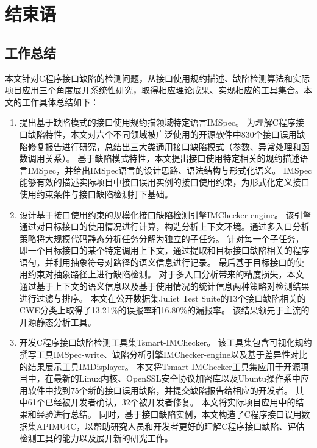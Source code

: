\chapter{结束语}
\label{cha:con}

\section{工作总结}
本文针对C程序接口缺陷的检测问题，从接口使用规约描述、缺陷检测算法和实际项目应用三个角度展开系统性研究，取得相应理论成果、实现相应的工具集合。本文的工作具体总结如下：
\begin{enumerate}
	\item 提出基于缺陷模式的接口使用规约描领域特定语言IMSpec。
	为理解C程序接口缺陷特性，本文对六个不同领域被广泛使用的开源软件中830个接口误用缺陷修复报告进行研究，总结出三大类通用接口缺陷模式（参数、异常处理和函数调用关系）。
	基于缺陷模式特性，本文提出接口使用特定相关的规约描述语言IMSpec，并给出IMSpec语言的设计思路、语法结构与形式化语义。
	IMSpec能够有效的描述实际项目中接口误用实例的接口使用约束，为形式化定义接口使用约束条件与接口缺陷检测打下基础。
	
	\item 设计基于接口使用约束的规模化接口缺陷检测引擎IMChecker-engine。
	该引擎通过对目标接口的使用情况进行计算，构造分析上下文环境。通过多入口分析策略将大规模代码静态分析任务分解为独立的子任务。
	针对每一个子任务，即一个目标接口的某个特定调用上下文，通过提取和目标接口缺陷相关的程序语句，并利用抽象符号对路径的语义信息进行记录。
	最后基于目标接口的使用约束对抽象路径上进行缺陷检测。
	对于多入口分析带来的精度损失，本文通过基于上下文的语义信息以及基于使用情况的统计信息两种策略对检测结果进行过滤与排序。
	本文在公开数据集Juliet Test Suite的13个接口缺陷相关的CWE分类上取得了13.21\%的误报率和16.80\%的漏报率。
	该结果领先于主流的开源静态分析工具。
	
	\item 开发C程序接口缺陷检测工具集Tsmart-IMChecker。
	该工具集包含可视化规约撰写工具IMSpec-write、缺陷分析引擎IMChecker-engine以及基于差异性对比的结果展示工具IMDisplayer。
	本文将Tsmart-IMChecker工具集应用于开源项目中，在最新的Linux内核、OpenSSL安全协议加密库以及Ubuntu操作系中应用软件中找到75个新的接口误用缺陷，并提交缺陷报告给相应的开发者。
	其中61个已经被开发者确认，32个被开发者修复。
	本文将实际项目应用中的结果和经验进行总结。
	同时，基于接口缺陷实例，本文构造了C程序接口误用数据集APIMU4C，以帮助研究人员和开发者更好的理解C程序接口缺陷、评估检测工具的能力以及展开新的研究工作。
	
\end{enumerate}


